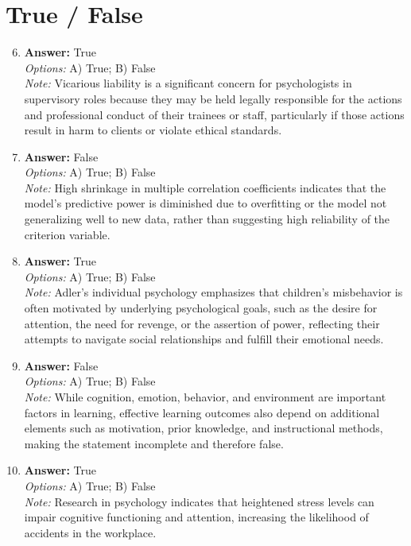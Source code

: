 \documentclass[12pt]{article}
\begin{document}
\section*{True / False}
\begin{enumerate}[label=\arabic*.]
\setcounter{enumi}{5}
\item \textbf{Answer:} True
\\ \textit{Options:} A) True; B) False
\\ \textit{Note:} Vicarious liability is a significant concern for psychologists in supervisory roles because they may be held legally responsible for the actions and professional conduct of their trainees or staff, particularly if those actions result in harm to clients or violate ethical standards.
\item \textbf{Answer:} False
\\ \textit{Options:} A) True; B) False
\\ \textit{Note:} High shrinkage in multiple correlation coefficients indicates that the model's predictive power is diminished due to overfitting or the model not generalizing well to new data, rather than suggesting high reliability of the criterion variable.
\item \textbf{Answer:} True
\\ \textit{Options:} A) True; B) False
\\ \textit{Note:} Adler's individual psychology emphasizes that children's misbehavior is often motivated by underlying psychological goals, such as the desire for attention, the need for revenge, or the assertion of power, reflecting their attempts to navigate social relationships and fulfill their emotional needs.
\item \textbf{Answer:} False
\\ \textit{Options:} A) True; B) False
\\ \textit{Note:} While cognition, emotion, behavior, and environment are important factors in learning, effective learning outcomes also depend on additional elements such as motivation, prior knowledge, and instructional methods, making the statement incomplete and therefore false.
\item \textbf{Answer:} True
\\ \textit{Options:} A) True; B) False
\\ \textit{Note:} Research in psychology indicates that heightened stress levels can impair cognitive functioning and attention, increasing the likelihood of accidents in the workplace.
\end{enumerate}
\end{document}
